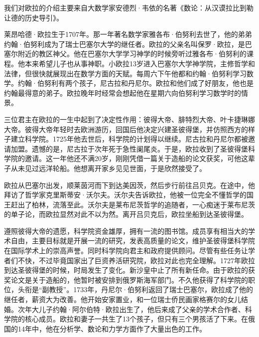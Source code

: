 \documentclass[b5paper]{ctexart}
\begin{document}
\begin{mdframed}
我们对欧拉的介绍主要来自大数学家安德烈·韦依的名著《数论：从汉谟拉比到勒让德的历史导引》。

莱昂哈德·欧拉生于1707年。那一年著名数学家雅各布·伯努利去世了，他的弟弟约翰·伯努利成为了瑞士巴塞尔大学的继任者。欧拉的父亲名叫保罗·欧拉，是巴塞尔附近的教区神父。他在巴塞尔大学学习神学的时候旁听过雅各布·伯努利的课程。他本来希望儿子也从事神职。小欧拉13岁进入巴塞尔大学神学院，主修哲学和法律，但很快就展现出在数学方面的天赋。每周六下午他都和约翰·伯努利学习数学。约翰·伯努利有两个孩子，尼古拉和丹尼尔。欧拉和他们成了好朋友，他也是约翰最得意的弟子。欧拉晚年时经常会想起他在星期六向伯努利学习数学时的情景。

三位君主在欧拉的一生中起到了决定性作用：彼得大帝、腓特烈大帝、叶卡捷琳娜大帝。彼得大帝年轻时去欧洲游历，回国后他决定兴建圣彼得堡，并仿照西方的样子建立科学院。1725年他去世后，科学院的计划得以继续。尼古拉和丹尼尔都被邀请加盟。遗憾的是，尼古拉于次年死于急性阑尾炎。于是，欧拉收到了圣彼得堡科学院的邀请。这一年他还不满20岁，刚刚凭借一篇关于造船的论文获奖，可他这辈子从未见过远洋轮船。他想离开家乡见见世面，于是欣然接受了。

欧拉从巴塞尔出发，顺莱茵河而下到达美因茨，然后步行前往吕贝克。在途中，他拜访了哲学家克里斯蒂安·沃尔夫。沃尔夫告诉欧拉，他被一位完全不懂哲学的国王赶出了柏林，流落至此。沃尔夫是莱布尼茨哲学的追随者，一心痴迷于莱布尼茨的单子论，而欧拉显然对此不以为然。离开吕贝克后，欧拉坐船到达圣彼得堡。

遵照彼得大帝的遗愿，科学院资金雄厚，拥有一流的图书馆。成员享有相当大的学术自由，主要目标就是开展一流的研究，发表高质量的论文，维护圣彼得堡科学院在国际学术上的崇高声誉。同时科学院向君主和政府提供顾问。尽管有些任务让学者们不快，不过毕竟国家出了巨资养活研究院，欧拉对此也完全理解。1727年欧拉到达圣彼得堡的时候，时局发生了变化。新沙皇中止了所有新任命。由于欧拉的获奖论文是关于造船的，他暂时被安排到俄罗斯海军部门。不久他获得了科学院的职位，头衔是“副教授”。1733年，丹尼尔·伯努利返回了瑞士巴塞尔，欧拉成了他的继任者，薪资大为改善。他开始安家置业，和一位瑞士侨民画家格赛尔的女儿结婚。次年大儿子约翰·阿尔伯特·欧拉出生了，他后来成了父亲的学术合作者、科学院的核心成员。欧拉和妻子一共生了13个孩子，但只有三个男孩活了下来。在俄国的14年中，他在分析学、数论和力学方面作了大量出色的工作。


\end{mdframed}
\end{document}
